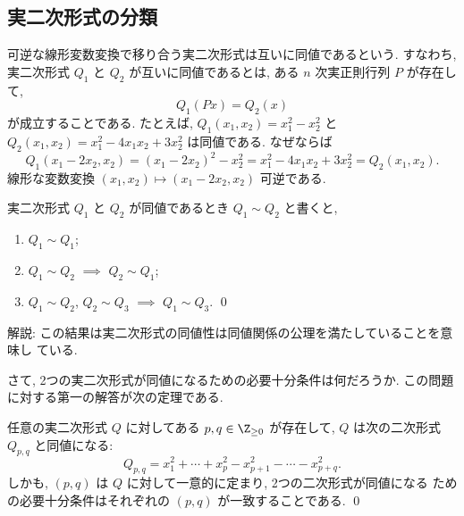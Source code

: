 \documentclass[12pt,twoside]{jarticle}
\begin{document}

\subsection{実二次形式の分類}
\label{sec:classify-real-q-form}

可逆な線形変数変換で移り合う実二次形式は互いに同値であるという. 
すなわち, 実二次形式 $Q_1$ と $Q_2$ が互いに同値であるとは,
ある $n$ 次実正則行列 $P$ が存在して,
\begin{equation*}
  Q_1(Px) = Q_2(x)
\end{equation*}
が成立することである.  
たとえば, $Q_1(x_1,x_2) = x_1^2 - x_2^2$
と $Q_2(x_1,x_2) = x_1^2 - 4 x_1x_2 + 3 x_2^2$ は同値である.  なぜならば
\begin{equation*}
  Q_1(x_1-2x_2, x_2) = (x_1-2x_2)^2 - x_2^2 
  = x_1^2 - 4 x_1x_2 + 3 x_2^2 = Q_2(x_1,x_2).
\end{equation*}
線形な変数変換 $(x_1,x_2)\mapsto(x_1-2x_2, x_2)$ 可逆である.

\begin{question}
  実二次形式 $Q_1$ と $Q_2$ が同値であるとき $Q_1\sim Q_2$ と書くと,
  \begin{enumerate}
  \item $Q_1\sim Q_1$;
  \item $Q_1\sim Q_2$ $\implies$ $Q_2\sim Q_1$;
  \item $Q_1\sim Q_2$, $Q_2\sim Q_3$ $\implies$ $Q_1\sim Q_3$.
    \qed
  \end{enumerate}
\end{question}

\noindent
解説: この結果は実二次形式の同値性は同値関係の公理を満たしていることを意味し
ている.

\medskip

さて, 2つの実二次形式が同値になるための必要十分条件は何だろうか.
この問題に対する第一の解答が次の定理である.

\begin{theorem}[Sylvester]
\label{theorem:sylvester}
  任意の実二次形式 $Q$ に対してある $p,q\in\Z_{\ge0}$ が存在して,
  $Q$ は次の二次形式 $Q_{p,q}$ と同値になる:
  \begin{equation*}
    Q_{p,q} = x_1^2 + \cdots + x_p^2 - x_{p+1}^2 - \cdots - x_{p+q}^2.
  \end{equation*}
  しかも, $(p,q)$ は $Q$ に対して一意的に定まり, 2つの二次形式が同値になる
  ための必要十分条件はそれぞれの $(p,q)$ が一致することである. \qed
\end{theorem}
\end{document}

